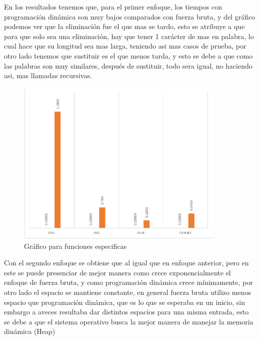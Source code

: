 En los resultados tenemos que, para el primer enfoque, los tiempos con programación dinámica son muy bajos comparados con fuerza bruta, y del gráfico podemos ver que la eliminación fue el que mas se tardo, esto se atribuye a que para que solo sea una eliminación, hay que tener 1 carácter de mas en palabra, lo cual hace que su longitud sea mas larga, teniendo asi mas casos de prueba, por otro lado tenemos que sustituir es el que menos tarda, y esto se debe a que como las palabras son muy similares, después de sustituir, todo sera igual, no haciendo asi, mas llamadas recursivas.



\begin{figure}[H]
    \centering
    \includegraphics[width=10cm, height=8cm]{images/especifico.png}
    \caption{Gráfico para funciones especificas}
    \label{fig:especifico}
\end{figure}

Con el segundo enfoque se obtiene que al igual que en enfoque anterior, pero en este se puede presenciar de mejor manera como crece exponencialmente el enfoque de fuerza bruta, y como programación dinámica crece mínimamente, por otro lado el espacio se mantiene constante, en general fuerza bruta utilizo menos espacio que programación dinámica, que es lo que se esperaba en un inicio, sin embargo a aveces resultaba dar distintos espacios para una misma entrada, esto se debe a que el sistema operativo busca la mejor manera de manejar la memoria dinámica (Heap)

